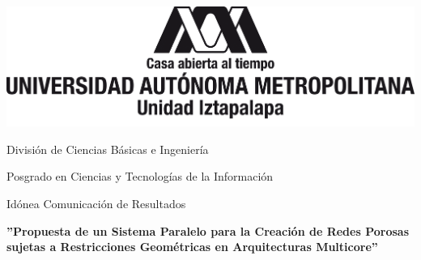 \thispagestyle{empty}
	

\begingroup
\setlength{\parindent}{0cm}
\begin{minipage}[t]{\textwidth}
	\begin{center}
	\includegraphics[width=\textwidth]{img/variacion3Izt.png}
	\end{center}
\end{minipage}
\endgroup



\centerline{\large  División de Ciencias Básicas e Ingeniería}
\vspace{0.5cm}
\centerline{\large Posgrado en Ciencias y Tecnologías de la Información}
\vspace{0.5cm}
\centerline{\large  Idónea Comunicación de Resultados}

\begin{center}
\Large \bf
''Propuesta de un Sistema Paralelo para la Creación de Redes Porosas sujetas a Restricciones Geométricas en Arquitecturas Multicore''
\end{center}

